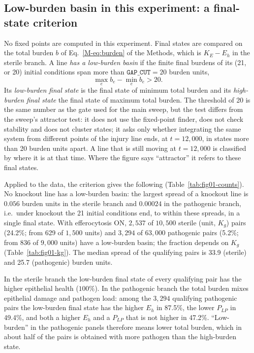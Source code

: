 \documentclass[11pt]{article}
\begin{document}
\subsection{Low-burden basin in this experiment: a final-state criterion}
\label{sec:fig1-basin}

No fixed points are computed in this experiment. Final states are compared on the
total burden $b$ of Eq.~\ref{M-eq:burden} of the Methods, which is $K_E - E_h$ in the sterile branch.
A line \emph{has a low-burden basin} if the finite final burdens of its
(21, or 20) initial conditions span more than $\texttt{GAP\_CUT} = 20$ burden
units,
\begin{equation}
  \max_e b_e - \min_e b_e > 20 .
  \label{eq:fig01-gap}
\end{equation}
Its \emph{low-burden final state} is the final state of minimum total burden and its
\emph{high-burden final state} the final state of maximum total burden. The threshold of
20 is the same number as the gate used for the main sweep, but the test differs from
the sweep's attractor test: it does not use the fixed-point finder, does not check
stability and does not cluster states; it asks only whether integrating the same
system from different points of the injury line ends, at $t = 12{,}000$, in states
more than 20 burden units apart. A line that is still moving at $t = 12{,}000$ is
classified by where it is at that time. Where the figure says ``attractor'' it refers
to these final states.

Applied to the data, the criterion gives the following (Table~\ref{tab:fig01-counts}).
No knockout line has a low-burden basin: the largest spread of a knockout line is
$0.056$ burden units in the sterile branch and $0.00024$ in the pathogenic branch,
i.e.\ under knockout the 21 initial conditions end, to within these spreads, in a
single final state.
With efferocytosis ON, $2{,}537$ of $10{,}500$ sterile (unit, $K_g$) pairs (24.2\%; from 629
of $1{,}500$ units) and $3{,}294$ of $63{,}000$ pathogenic pairs (5.2\%; from 836 of
$9{,}000$ units) have a low-burden basin; the fraction depends on $K_g$
(Table~\ref{tab:fig01-kg}). The median spread of the qualifying pairs is 33.9
(sterile) and 25.7 (pathogenic) burden units.

In the sterile branch the low-burden final state of every qualifying pair has
the higher epithelial health ($100\%$). In the pathogenic branch the total burden mixes
epithelial damage and pathogen load: among the $3{,}294$ qualifying pathogenic pairs
the low-burden final state has the higher $E_h$ in 87.5\%, the lower $P_{LP}$ in
49.4\%, and both a higher $E_h$ and a $P_{LP}$ that is not higher in 47.2\%.
``Low-burden'' in the pathogenic panels therefore means lower total burden, which in
about half of the pairs is obtained with more pathogen than the high-burden state.
\end{document}
